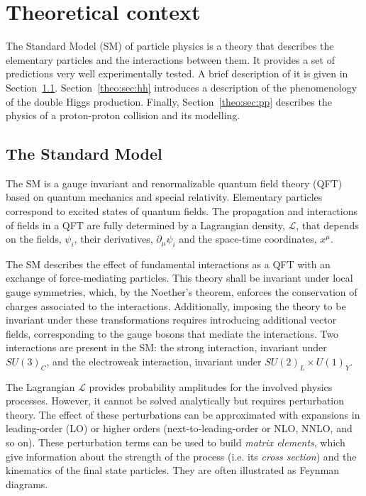 \documentclass[../main.tex]{subfiles}
\begin{document}
\chapter{Theoretical context}
\label{intro:chap:theo}

The Standard Model (SM) of particle physics is a theory that describes the elementary particles and the interactions between them. It provides a set of predictions very well experimentally tested. A brief description of it is given in Section~\ref{theo:sec:sm}. Section~\ref{theo:sec:hh} introduces a description of the phenomenology of the double Higgs production. Finally, Section~\ref{theo:sec:pp} describes the physics of a proton-proton collision and its modelling.

\section{The Standard Model}
\label{theo:sec:sm}

The SM is a gauge invariant and renormalizable quantum field theory (QFT) based on quantum mechanics and special relativity. Elementary particles correspond to excited states of quantum fields. The propagation and interactions of fields in a QFT are fully determined by a Lagrangian density, $\mathcal{L}$, that depends on the fields, $\psi_i$, their derivatives, $\partial_\mu \psi_i$ and the space-time coordinates, $x^\mu$. 


The SM describes the effect of fundamental interactions as a QFT with an exchange of force-mediating particles. This theory shall be invariant under local gauge symmetries, which, by the Noether's theorem, enforces the conservation of charges associated to the interactions. Additionally, imposing the theory to be invariant under these transformations requires introducing additional vector fields, corresponding to the gauge bosons that mediate the interactions. Two interactions are present in the SM: the strong interaction, invariant under $SU(3)_C$, and the electroweak interaction, invariant under $SU(2)_L\times U(1)_Y$.


The Lagrangian $\mathcal{L}$ provides probability amplitudes for the involved physics processes. However, it cannot be solved analytically but requires perturbation theory. The effect of these perturbations can be approximated with expansions in leading-order (LO) or higher orders (next-to-leading-order or NLO, NNLO, and so on). These perturbation terms can be used to build \textit{matrix elements}, which give information about the strength of the process (i.e. its \textit{cross section}) and the kinematics of the final state particles. They are often illustrated as Feynman diagrams.
\end{document}
